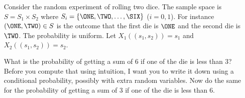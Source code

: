  Consider the random experiment of rolling two dice.
  The sample space is $S = S_1 \times S_2$ where
  $S_i = \{\ONE, \TWO, \ldots, \SIX \}$ ($i = 0, 1$).
  For instance $(\ONE, \TWO) \in S$ is the outcome that the first
  die is $\ONE$ and the second die is $\TWO$.
  The probability is uniform.
  Let $X_1((s_1, s_2)) = s_1$ and $X_2((s_1, s_2)) = s_2$.
  \begin{myenum}
    \li
    What is the probability of getting a sum of 6 if
    one of the die is less than 3?
    Before you compute that using intuition, I want
    you to write it down using a conditional probability,
    possibly with extra random variables.
    \li
    Now do the same for 
    the probability of getting a sum of 3 if
    one of the die is less than 6.
  \end{myenum}
